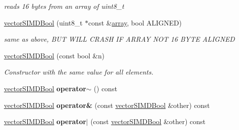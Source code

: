 \begin{DoxyCompactItemize}
\begin{DoxyCompactList}\small\item\em reads 16 bytes from an array of uint8\+\_\+t \end{DoxyCompactList}\item 
\hyperlink{classirr_1_1core_1_1vectorSIMDBool_ab364494d57b5d4d6d72a0aac023dc0fe}{vector\+S\+I\+M\+D\+Bool} (uint8\+\_\+t $\ast$const \&\hyperlink{classirr_1_1core_1_1array}{array}, bool A\+L\+I\+G\+N\+ED)\hypertarget{classirr_1_1core_1_1vectorSIMDBool_ab364494d57b5d4d6d72a0aac023dc0fe}{}\label{classirr_1_1core_1_1vectorSIMDBool_ab364494d57b5d4d6d72a0aac023dc0fe}

\begin{DoxyCompactList}\small\item\em same as above, B\+UT W\+I\+LL C\+R\+A\+SH IF A\+R\+R\+AY N\+OT 16 B\+Y\+TE A\+L\+I\+G\+N\+ED \end{DoxyCompactList}\item 
\hyperlink{classirr_1_1core_1_1vectorSIMDBool_a79087cc22b1a48c9e811cab79011e29a}{vector\+S\+I\+M\+D\+Bool} (const bool \&n)\hypertarget{classirr_1_1core_1_1vectorSIMDBool_a79087cc22b1a48c9e811cab79011e29a}{}\label{classirr_1_1core_1_1vectorSIMDBool_a79087cc22b1a48c9e811cab79011e29a}

\begin{DoxyCompactList}\small\item\em Constructor with the same value for all elements. \end{DoxyCompactList}\item 
\hyperlink{classirr_1_1core_1_1vectorSIMDBool}{vector\+S\+I\+M\+D\+Bool} {\bfseries operator$\sim$} () const \hypertarget{classirr_1_1core_1_1vectorSIMDBool_a72913adcd124cb0e45fae14e1203e1c6}{}\label{classirr_1_1core_1_1vectorSIMDBool_a72913adcd124cb0e45fae14e1203e1c6}

\item 
\hyperlink{classirr_1_1core_1_1vectorSIMDBool}{vector\+S\+I\+M\+D\+Bool} {\bfseries operator\&} (const \hyperlink{classirr_1_1core_1_1vectorSIMDBool}{vector\+S\+I\+M\+D\+Bool} \&other) const \hypertarget{classirr_1_1core_1_1vectorSIMDBool_a3923f9dba4a3dc390b3ea722c06916bf}{}\label{classirr_1_1core_1_1vectorSIMDBool_a3923f9dba4a3dc390b3ea722c06916bf}

\item 
\hyperlink{classirr_1_1core_1_1vectorSIMDBool}{vector\+S\+I\+M\+D\+Bool} {\bfseries operator$\vert$} (const \hyperlink{classirr_1_1core_1_1vectorSIMDBool}{vector\+S\+I\+M\+D\+Bool} \&other) const \hypertarget{classirr_1_1core_1_1vectorSIMDBool_a9e1f8e6bf368e9def14a2c4ec9f27d3c}{}\label{classirr_1_1core_1_1vectorSIMDBool_a9e1f8e6bf368e9def14a2c4ec9f27d3c}


\end{DoxyCompactItemize}
